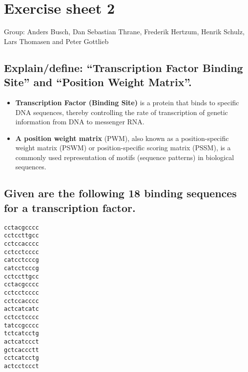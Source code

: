 \documentclass[a4paper,10pt,titlepage]{article}
\begin{document}
\section*{Exercise sheet 2}

Group: Anders Busch, Dan Sebastian Thrane, Frederik Hertzum, Henrik Schulz, Lars Thomasen and Peter Gottlieb

\subsection*{Explain/define: “Transcription Factor Binding Site” and “Position Weight Matrix”.}

\begin{itemize}
\item
\textbf{Transcription Factor (Binding Site)} is a protein that binds to specific DNA sequences, thereby controlling the rate of transcription of genetic information from DNA to messenger RNA.
\item
\textbf{A position weight matrix} (PWM), also known as a position-specific weight matrix (PSWM) or position-specific scoring matrix (PSSM), is a commonly used representation of motifs (sequence patterns) in biological sequences.
\end{itemize}

\subsection*{Given are the following 18 binding sequences for a transcription factor.}

\begin{verbatim}
cctacgcccc   
cctccttgcc
cctccacccc   
cctcctcccc
catcctcccg   
catcctcccg
cctccttgcc   
cctacgcccc
cctcctcccc   
cctccacccc
actcatcatc   
cctcctcccc
tatccgcccc   
tctcatcctg
actcatccct   
gctcaccctt
cctcatcctg   
actcctccct
\end{verbatim}
\end{document}
